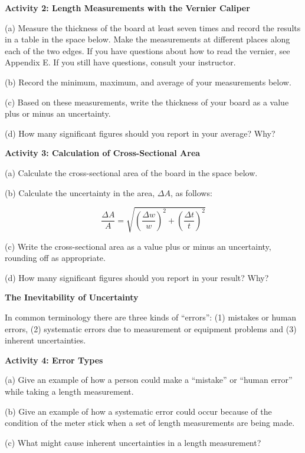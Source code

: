 \textbf{Activity 2: Length Measurements with the Vernier Caliper }

(a) Measure the thickness of the board at least seven times and record the results
in a table in the space below. Make the measurements at different places along
each of the two edges. If you have questions about how to read the vernier,
see Appendix E. If you still have questions, consult your instructor.
\vspace{25mm}

(b) Record the minimum, maximum, and average of your measurements below.
\vspace{20mm}

(c) Based on these measurements, write the thickness of your board as a value plus or minus an uncertainty.
\vspace{15mm}

(d) How many significant figures should you report in your average? Why? 
\vspace{15mm}

\textbf{Activity 3: Calculation of Cross-Sectional Area} 

(a) Calculate the cross-sectional area of the board in the space below.
\vspace{15mm}

(b) Calculate the uncertainty in the area, \( \Delta  A\), as follows:

   $$ \frac{\Delta A}{A} = \sqrt{\left(\frac{\Delta w}{w}\right)^2 + \left(\frac{\Delta t}{t}\right)^2}$$
\vspace{20mm}

(c) Write the cross-sectional area as a value plus or minus an uncertainty, rounding off as appropriate.
\vspace{15mm}

(d) How many significant figures should you report in your result? Why?
\vspace{15mm}

\textbf{The Inevitability of Uncertainty} 

In common terminology there are three kinds of ``errors'': (1)
mistakes or human errors, (2) systematic errors due to measurement or equipment
problems and (3) inherent uncertainties.

\textbf{Activity 4: Error Types} 

(a) Give an example of how a person could make a ``mistake''
or ``human error'' while taking a length measurement.
\vspace{15mm}

(b) Give an example of how a systematic error could occur because of the condition
of the meter stick when a set of length measurements are being made.
\vspace{20mm}

(c) What might cause inherent uncertainties in a length measurement?


